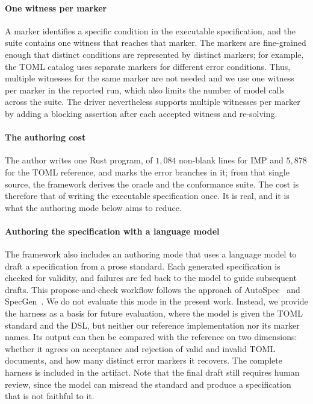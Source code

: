 \documentclass[sigconf,screen]{acmart}
\theoremstyle{definition}
\theoremstyle{remark}
\newcommand{\imp}{IMP}
\newcommand{\toml}{TOML}
\begin{document}
\paragraph{One witness per marker}
A marker identifies a specific condition in the executable specification, and the suite contains one witness that reaches that marker. The markers are fine-grained enough that distinct conditions are represented by distinct markers; for example, the \toml{} catalog uses separate markers for different error conditions. Thus, multiple witnesses for the same marker are not needed and we use one witness per marker in the reported run, which also limits the number of model calls across the suite. The driver nevertheless supports multiple witnesses per marker by adding a blocking assertion after each accepted witness and re-solving.

\paragraph{The authoring cost}
The author writes one Rust program, of $1{,}084$ non-blank lines for \imp{} and
$5{,}878$ for the \toml{} reference, and marks the error branches in it; from
that single source, the framework derives the oracle and the conformance suite. The cost is therefore that of writing the executable specification
once. It is real, and it is what the authoring mode below aims to reduce.

\paragraph{Authoring the specification with a language model}
The framework also includes an authoring mode that uses a language model to draft a specification from a prose standard. Each generated specification is checked for validity, and failures are fed back to the model to guide subsequent drafts. This propose-and-check workflow follows the approach of AutoSpec~\cite{wen2024autospec} and SpecGen~\cite{ma2024specgen}. We do not evaluate this mode in the present work. Instead, we provide the harness as a basis for future evaluation, where the model is given the \toml{} standard and the DSL, but neither our reference implementation nor its marker names. Its output can then be compared with the reference on two dimensions: whether it agrees on acceptance and rejection of valid and invalid TOML documents, and how many distinct error markers it recovers. The complete harness is included in the artifact. Note that the final draft still requires human review, since the model can misread the standard and produce a specification that is not faithful to it.
\end{document}
